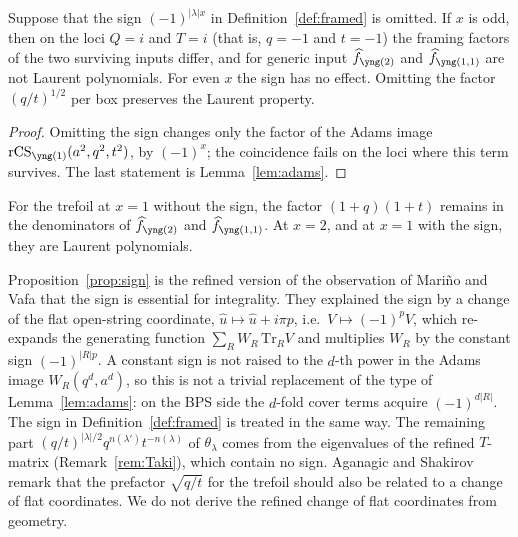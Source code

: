 \begin{proposition}\label{prop:sign}
Suppose that the sign $(-1)^{|\lambda|x}$ in Definition~\ref{def:framed} is omitted. If $x$ is odd, then on the loci $Q=i$ and $T=i$ (that is, $q=-1$ and $t=-1$)
the framing factors of the two surviving inputs differ, and for generic input $\hf_{\yng(2)}$ and $\hf_{\yng(1,1)}$ are not Laurent polynomials.
For even $x$ the sign has no effect. Omitting the factor $(q/t)^{1/2}$ per box preserves the Laurent property.
\end{proposition}
\begin{proof}
Omitting the sign changes only the factor of the Adams image $\rCS_{\yng(1)}(a^2,q^2,t^2)$, by $(-1)^x$; the coincidence fails on the loci where this term survives.
The last statement is Lemma~\ref{lem:adams}.
\end{proof}
\begin{compresult}
For the trefoil at $x=1$ without the sign, the factor $(1+q)(1+t)$ remains in the denominators of $\hf_{\yng(2)}$ and $\hf_{\yng(1,1)}$.
At $x=2$, and at $x=1$ with the sign, they are Laurent polynomials.
\end{compresult}

Proposition~\ref{prop:sign} is the refined version of the observation of Mari\~no and Vafa \cite{Marino01} that the sign is essential for integrality.
They explained the sign by a change of the flat open-string coordinate, $\hat u\mapsto\hat u+i\pi p$, i.e.\ $V\mapsto(-1)^pV$,
which re-expands the generating function $\sum_RW_R\,\mathrm{Tr}_RV$ and multiplies $W_R$ by the constant sign $(-1)^{|R|p}$.
A constant sign is not raised to the $d$-th power in the Adams image $W_R(q^d,a^d)$, so this is not a trivial replacement of the type of Lemma~\ref{lem:adams}:
on the BPS side the $d$-fold cover terms acquire $(-1)^{d|R|}$. The sign in Definition~\ref{def:framed} is treated in the same way.
The remaining part $(q/t)^{|\lambda|/2}q^{n(\lambda')}t^{-n(\lambda)}$ of $\theta_\lambda$ comes from the eigenvalues of the refined $T$-matrix (Remark~\ref{rem:Taki}), which contain no sign.
Aganagic and Shakirov \cite{Aganagic11} remark that the prefactor $\sqrt{q/t}$ for the trefoil should also be related to a change of flat coordinates.
We do not derive the refined change of flat coordinates from geometry.

